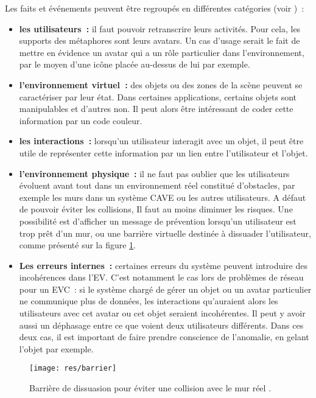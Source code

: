 \documentclass[11pt]{article}
\begin{document}
Les faits et événements peuvent être regroupés en différentes catégories (voir \cite{survey})~:
\begin{itemize}
	\item \textbf{les utilisateurs~:} il faut pouvoir retranscrire leurs activités. Pour cela, les supports des métaphores sont leurs avatars. Un cas d'usage serait le fait de mettre en évidence un avatar qui a un rôle particulier dans l'environnement, par le moyen d'une icône placée au-dessus de lui par exemple.
	\item \textbf{l'environnement virtuel~:} des objets ou des zones de la scène peuvent se caractériser par leur état. Dans certaines applications, certains objets sont manipulables et d'autres non. Il peut alors être intéressant de coder cette information par un code couleur.
	\item \textbf{les interactions~:} lorsqu'un utilisateur interagit avec un objet, il peut être utile de représenter cette information par un lien entre l'utilisateur et l'objet.
	\item \textbf{l'environnement physique~:} il ne faut pas oublier que les utilisateurs évoluent avant tout dans un environnement réel constitué d'obstacles, par exemple les murs dans un système CAVE ou les autres utilisateurs. A défaut de pouvoir éviter les collisions, Il faut au moins diminuer les risques. Une possibilité est d'afficher un message de prévention lorsqu'un utilisateur est trop prêt d'un mur, ou une barrière virtuelle destinée à dissuader l'utilisateur, comme présenté sur la figure \ref{fig:barrier}.
	\item \textbf{Les erreurs internes~:} certaines erreurs du système peuvent introduire des incohérences dans l'EV. C'est notamment le cas lors de problèmes de réseau pour un EVC~: si le système chargé de gérer un objet ou un avatar particulier ne communique plus de données, les interactions qu'auraient alors les utilisateurs avec cet avatar ou cet objet seraient incohérentes. Il peut y avoir aussi un déphasage entre ce que voient deux utilisateurs différents. Dans ces deux cas, il est important de faire prendre conscience de l'anomalie, en gelant l'objet par exemple.
\end{itemize}

\begin{figure}
\centering
\texttt{[image: res/barrier]}
\caption{\label{fig:barrier}Barrière de dissuasion pour éviter une collision avec le mur réel \cite{survey}.}
\end{figure}
\end{document}
